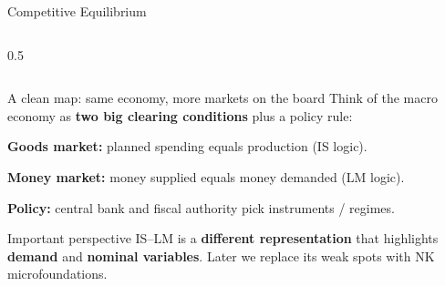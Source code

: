 \documentclass[aspectratio=169,xcolor=dvipsnames]{beamer}
\let\tempone\itemize
\let\temptwo\enditemize
\renewenvironment{itemize}{\tempone\addtolength{\itemsep}{\fill}}{\temptwo}
\begin{document}
\begin{frame}{Competitive Equilibrium}
\begin{columns}
\begin{column}{0.5\textwidth}
        \end{column}
    \end{columns}
\end{frame}

\begin{frame}{A clean map: same economy, more markets on the board}
\small
Think of the macro economy as \textbf{two big clearing conditions} plus a policy rule:

\begin{itemize}
\item \textbf{Goods market:} planned spending equals production (IS logic).
\item \textbf{Money market:} money supplied equals money demanded (LM logic).
\item \textbf{Policy:} central bank and fiscal authority pick instruments / regimes.
\end{itemize}

\begin{block}{Important perspective}
IS--LM is a \textbf{different representation} that highlights \textbf{demand} and \textbf{nominal variables}. Later we replace its weak spots with NK microfoundations.
\end{block}
\end{frame}
\end{document}
